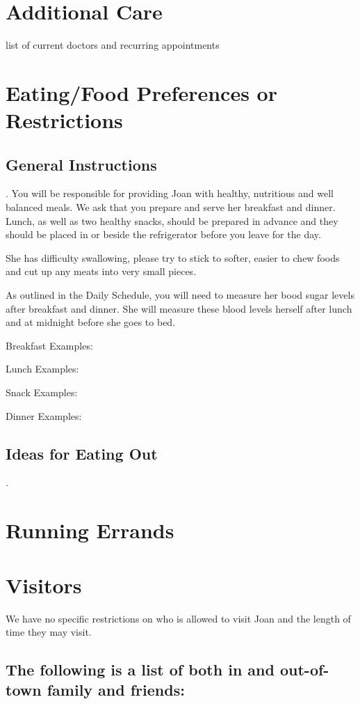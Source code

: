 \documentclass[]{article}
\begin{document}
\section*{Additional Care}

list of current doctors and recurring appointments

\section*{Eating/Food Preferences or Restrictions}

\subsection*{General Instructions}. You will be responsible for providing Joan with healthy, nutritious and well balanced meals. We ask that you prepare and serve her breakfast and dinner. Lunch, as well as two healthy snacks, should be prepared in advance and they should be placed in or beside the refrigerator before you leave for the day.

She has difficulty swallowing, please try to stick to softer, easier to chew foods and cut up any meats into very small pieces.

As outlined in the Daily Schedule, you will need to measure her bood sugar levels after breakfast and dinner. She will measure these blood levels herself after lunch and at midnight before she goes to bed.

Breakfast Examples:


Lunch Examples:


Snack Examples:


Dinner Examples:


\subsection*{Ideas for Eating Out}.

\section*{Running Errands}

\section*{Visitors}
We have no specific restrictions on who is allowed to visit Joan and the
length of time they may visit. 

\subsection*{The following is a list of both in and out-of-town family and friends:}
\end{document}
